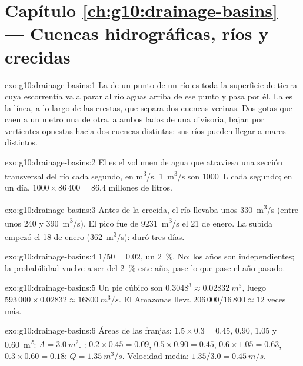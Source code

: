 \section*{Capítulo \ref{ch:g10:drainage-basins} --- Cuencas hidrográficas, ríos y crecidas}

\begin{solution}{exo:g10:drainage-basins:1}
La  de un punto de un río es toda la superficie de tierra
cuya escorrentía va a parar al río aguas arriba de ese punto y pasa por él.
La  es la línea, a lo largo de las crestas, que separa dos
cuencas vecinas. Dos gotas que caen a un metro una de otra, a ambos lados de
una divisoria, bajan por vertientes opuestas hacia dos cuencas distintas: sus
ríos pueden llegar a mares distintos.
\end{solution}

\begin{solution}{exo:g10:drainage-basins:2}
El  es el volumen de agua que atraviesa una sección transversal del río
cada segundo, en \unit{m^3/s}. \qty{1}{m^3/s} son \qty{1000}{L} cada
segundo; en un día, $1000 \times 86\,400 = 86.4$ millones de litros.
\end{solution}

\begin{solution}{exo:g10:drainage-basins:3}
Antes de la crecida, el río llevaba unos \qty{330}{m^3/s} (entre unos
\num{240} y \qty{390}{m^3/s}). El pico fue de \qty{9231}{m^3/s} el
21 de enero. La subida empezó el 18 de enero (\qty{362}{m^3/s}): duró tres
días.
\end{solution}

\begin{solution}{exo:g10:drainage-basins:4}
$1/50 = 0.02$, un \qty{2}{\percent}. No: los años son independientes; la
probabilidad vuelve a ser del \qty{2}{\percent} este año, pase lo que pase el
año pasado.
\end{solution}

\begin{solution}{exo:g10:drainage-basins:5}
Un pie cúbico son $0.3048^3 \approx \qty{0.02832}{m^3}$, luego
$593\,000 \times 0.02832 \approx \qty{16800}{m^3/s}$. El Amazonas lleva
$206\,000/16\,800 \approx 12$ veces más.
\end{solution}

\begin{solution}{exo:g10:drainage-basins:6}
Áreas de las franjas: $1.5 \times 0.3 = 0.45$, $0.90$, $1.05$ y
\qty{0.60}{m^2}: $A = \qty{3.0}{m^2}$. : $0.2 \times 0.45 = 0.09$, $0.5 \times 0.90
= 0.45$, $0.6 \times 1.05 = 0.63$, $0.3 \times 0.60 = 0.18$: $Q =
\qty{1.35}{m^3/s}$. Velocidad media: $1.35/3.0 = \qty{0.45}{m/s}$.
\end{solution}


